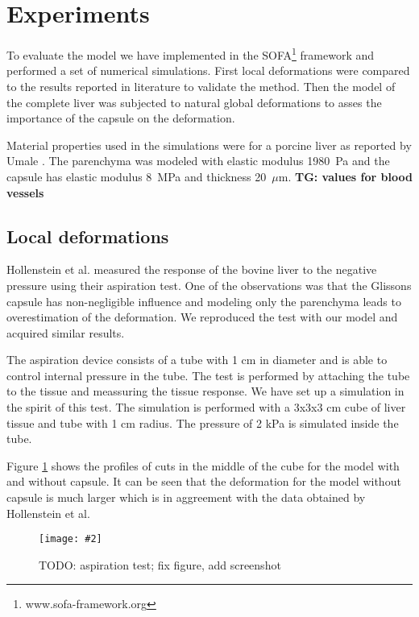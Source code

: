 \documentclass{llncs}
\newcommand{\TG}[1]{{\color{blue}\textbf{TG: #1}}}
\newcommand{\Figure}[3]{%
\begin{figure}[htb]
  \centering
  \texttt{[image: \#2]}
  \caption{\label{fig-#2}#3}
\end{figure}}
\begin{document}



\section{Experiments} %

To evaluate the model we have implemented in the
SOFA\footnote{www.sofa-framework.org} framework and performed a set of
numerical simulations. First local deformations were compared to the
results reported in literature to validate the method. Then the model of
the complete liver was subjected to natural global deformations to asses
the importance of the capsule on the deformation.

Material properties used in the simulations were for a porcine liver as
reported by Umale \cite{Umale2013}. The
parenchyma was modeled with elastic modulus 1980~Pa and the capsule has
elastic modulus 8~MPa and thickness 20~$\mu$m.
\TG{values for blood vessels}

\subsection{Local deformations} %

Hollenstein et al. \cite{Hollenstein2006} measured the response of the
bovine liver to the negative pressure using their aspiration test. One of
the observations was that the Glissons capsule has non-negligible influence
and modeling only the parenchyma leads to overestimation of the
deformation. We reproduced the test with our model and acquired similar
results.

The aspiration device consists of a tube with 1 cm in diameter and is able
to control internal pressure in the tube. The test is performed by
attaching the tube to the tissue and meassuring the tissue response. We
have set up a simulation in the spirit of this test. 
The simulation is performed with a 3x3x3 cm cube of liver tissue and tube
with 1 cm radius. The pressure of 2 kPa is simulated inside the tube.

Figure \ref{fig-aspiration} shows the profiles of cuts in the middle of the
cube for the model with and without capsule. It can be seen that the
deformation for the model without capsule is much larger which is in
aggreement with the data obtained by Hollenstein et al.

\Figure{4in}{aspiration}{TODO: aspiration test; fix figure, add screenshot}
\end{document}
